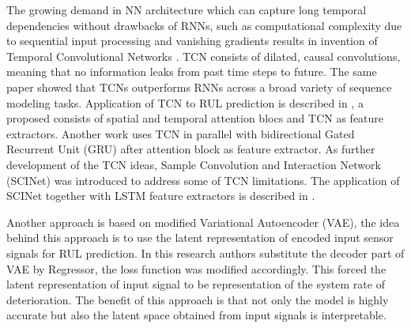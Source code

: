 The growing demand in NN architecture which can capture long temporal dependencies without drawbacks of RNNs, such as computational complexity due to sequential input processing and vanishing gradients results in invention of Temporal Convolutional Networks \cite{TCN2018}. TCN consists of dilated, causal convolutions, meaning that no information leaks from past time steps to future. The same paper showed that TCNs outperforms RNNs across a broad variety of sequence modeling tasks. Application of TCN to RUL prediction is described in \cite{DATCNN2021}, a proposed consists of spatial and temporal attention blocs and TCN as feature extractors. 
Another work \cite{BiGRUTCN2022} uses TCN in parallel with bidirectional Gated Recurrent Unit (GRU) after attention block as feature extractor.
As further development of the TCN ideas, Sample Convolution and Interaction Network (SCINet) was introduced to address some of TCN limitations. The application of SCINet together with LSTM feature extractors is described in \cite{Zhevnenko2023}.

Another approach is based on modified Variational Autoencoder (VAE), the idea behind this approach is to use the latent representation of encoded input sensor signals for RUL prediction. In this research \cite{COSTA2022108353} authors substitute the decoder part of VAE by Regressor, the loss function was modified accordingly. This forced the latent representation of input signal to be representation of the system rate of deterioration. The benefit of this approach is that not only the model is highly accurate but also the latent space obtained from input signals is interpretable.

